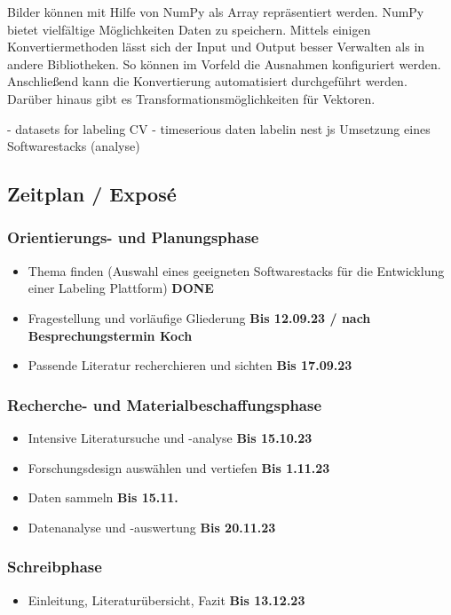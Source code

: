 Bilder können mit Hilfe von NumPy als Array repräsentiert werden. NumPy bietet vielfältige Möglichkeiten Daten zu speichern. Mittels einigen Konvertiermethoden lässt sich der Input und Output besser Verwalten als in andere Bibliotheken. So können im Vorfeld die Ausnahmen konfiguriert werden. Anschließend kann die Konvertierung automatisiert durchgeführt werden.
Darüber hinaus gibt es Transformationsmöglichkeiten für Vektoren.


- datasets for labeling CV
- timeserious daten labelin
nest js
Umsetzung eines Softwarestacks
(analyse)

\subsection*{Zeitplan / Exposé}
\subsubsection*{Orientierungs- und Planungsphase}
\begin{itemize}
    \item Thema finden (Auswahl eines geeigneten Softwarestacks für die Entwicklung einer Labeling Plattform) \textbf{DONE}
    \item Fragestellung und vorläufige Gliederung \textbf{Bis 12.09.23 / nach Besprechungstermin Koch}
    \item Passende Literatur recherchieren und sichten \textbf{Bis 17.09.23}
\end{itemize}

\subsubsection*{Recherche- und Materialbeschaffungsphase}
\begin{itemize}
    \item Intensive Literatursuche und -analyse \textbf{Bis 15.10.23}
    \item Forschungsdesign auswählen und vertiefen \textbf{Bis 1.11.23}
    \item Daten sammeln \textbf{Bis 15.11.}
    \item Datenanalyse und -auswertung \textbf{Bis 20.11.23} 
\end{itemize}


\subsubsection*{Schreibphase}
    \begin{itemize}
        \item Einleitung, Literaturübersicht, Fazit \textbf{Bis 13.12.23}
    \end{itemize}

